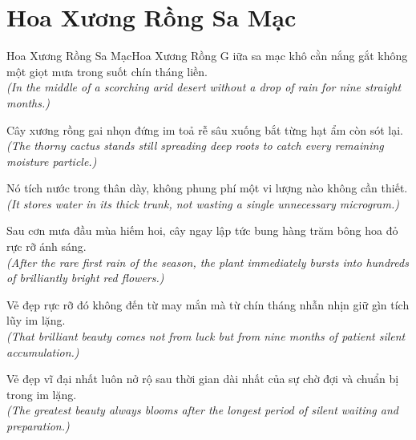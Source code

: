 \section{Hoa Xương Rồng Sa Mạc}
\begin{truyen}{Hoa Xương Rồng Sa Mạc}{Hoa Xương Rồng}
G iữa sa mạc khô cằn nắng gắt không một giọt mưa trong suốt chín tháng liền.\\
\textit{(In the middle of a scorching arid desert without a drop of rain for nine straight months.)}

Cây xương rồng gai nhọn đứng im toả rễ sâu xuống bắt từng hạt ẩm còn sót lại.\\
\textit{(The thorny cactus stands still spreading deep roots to catch every remaining moisture particle.)}

Nó tích nước trong thân dày, không phung phí một vi lượng nào không cần thiết.\\
\textit{(It stores water in its thick trunk, not wasting a single unnecessary microgram.)}

Sau cơn mưa đầu mùa hiếm hoi, cây ngay lập tức bung hàng trăm bông hoa đỏ rực rỡ ánh sáng.\\
\textit{(After the rare first rain of the season, the plant immediately bursts into hundreds of brilliantly bright red flowers.)}

Vẻ đẹp rực rỡ đó không đến từ may mắn mà từ chín tháng nhẫn nhịn giữ gìn tích lũy im lặng.\\
\textit{(That brilliant beauty comes not from luck but from nine months of patient silent accumulation.)}

\end{truyen}
\begin{baihoc}
  Vẻ đẹp vĩ đại nhất luôn nở rộ sau thời gian dài nhất của sự chờ đợi và chuẩn bị trong im lặng.\\
  \textit{(The greatest beauty always blooms after the longest period of silent waiting and preparation.)}
\end{baihoc}
